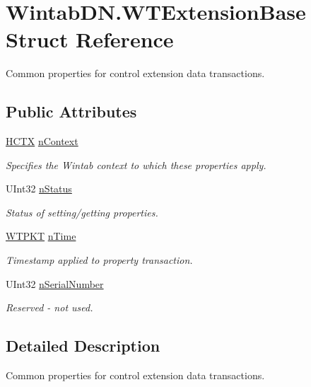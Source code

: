 \hypertarget{struct_wintab_d_n_1_1_w_t_extension_base}{}\section{Wintab\+D\+N.\+W\+T\+Extension\+Base Struct Reference}
\label{struct_wintab_d_n_1_1_w_t_extension_base}


Common properties for control extension data transactions.  


\subsection*{Public Attributes}
\begin{DoxyCompactItemize}
\item 
\mbox{\hyperlink{class_wintab_d_n_1_1_h_c_t_x}{H\+C\+TX}} \mbox{\hyperlink{struct_wintab_d_n_1_1_w_t_extension_base_ac85fdcc8cca84374c45ce182ebb5b395}{n\+Context}}
\begin{DoxyCompactList}\small\item\em Specifies the Wintab context to which these properties apply. \end{DoxyCompactList}\item 
U\+Int32 \mbox{\hyperlink{struct_wintab_d_n_1_1_w_t_extension_base_a704e5bfcd20c7fd1146853276ded26cd}{n\+Status}}
\begin{DoxyCompactList}\small\item\em Status of setting/getting properties. \end{DoxyCompactList}\item 
\mbox{\hyperlink{class_wintab_d_n_1_1_w_t_p_k_t}{W\+T\+P\+KT}} \mbox{\hyperlink{struct_wintab_d_n_1_1_w_t_extension_base_afe3cd64c753198651b1d0d701075a2c0}{n\+Time}}
\begin{DoxyCompactList}\small\item\em Timestamp applied to property transaction. \end{DoxyCompactList}\item 
U\+Int32 \mbox{\hyperlink{struct_wintab_d_n_1_1_w_t_extension_base_ab4adfcc268f523796c1898387c719fd3}{n\+Serial\+Number}}
\begin{DoxyCompactList}\small\item\em Reserved -\/ not used. \end{DoxyCompactList}\end{DoxyCompactItemize}


\subsection{Detailed Description}
Common properties for control extension data transactions. 



